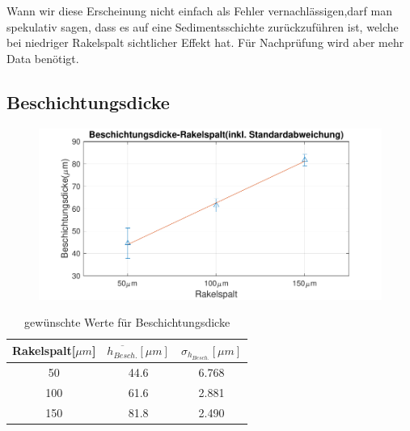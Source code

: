 \documentclass[12pt,UTF8]{article}
\begin{document}
Wann wir diese Erscheinung nicht einfach als Fehler vernachl\"assigen,darf man spekulativ sagen, dass es auf eine Sedimentsschichte zur\"uckzuf\"uhren ist, welche bei niedriger Rakelspalt sichtlicher Effekt hat. F\"ur Nachpr\"ufung wird aber mehr Data ben\"otigt.
\subsection{Beschichtungsdicke}
\begin{figure}[H]
    \centering
    \includegraphics[]{Diagramme/Beschichtungsdicke.pdf}
\end{figure}

\begin{table}[H]
    \centering
    \caption{gew\"unschte Werte f\"ur Beschichtungsdicke}
    \begin{tabular}{ccc}
        \midrule
        Rakelspalt[$\mu m$] & $\overline{h_{Besch.}}[\mu m]$ & $\sigma_{h_{Besch.}}[\mu m]$ \\
        \toprule
        50                  & 44.6                           & 6.768                        \\
        100                 & 61.6                           & 2.881                        \\
        150                 & 81.8                           & 2.490                        \\
        \midrule
    \end{tabular}
\end{table}
\end{document}
